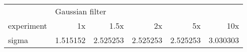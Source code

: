 \begin{tabular}{lrrrrr}
\toprule
{} & \multicolumn{5}{l}{Gaussian filter} \\
experiment &              1x &      1.5x &        2x &        5x &       10x \\
\midrule
sigma &        1.515152 &  2.525253 &  2.525253 &  2.525253 &  3.030303 \\
\bottomrule
\end{tabular}
